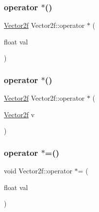 \mbox{\label{class_vector2f_aa294c4f2927395f299c8c2edcd20e9fa}} 
\subsubsection{\texorpdfstring{operator $\ast$()}{operator *()}\hspace{0.1cm}{\footnotesize\ttfamily [1/2]}}
{\footnotesize\ttfamily \mbox{\hyperlink{class_vector2f}{Vector2f}} Vector2f\+::operator $\ast$ (\begin{DoxyParamCaption}\item[{float}]{val }\end{DoxyParamCaption})}

\mbox{\label{class_vector2f_a9d3e3d9000757cb55b2c079a1051e4ec}} 
\subsubsection{\texorpdfstring{operator $\ast$()}{operator *()}\hspace{0.1cm}{\footnotesize\ttfamily [2/2]}}
{\footnotesize\ttfamily \mbox{\hyperlink{class_vector2f}{Vector2f}} Vector2f\+::operator $\ast$ (\begin{DoxyParamCaption}\item[{\mbox{\hyperlink{class_vector2f}{Vector2f}}}]{v }\end{DoxyParamCaption})}

\mbox{\label{class_vector2f_a236a3df8c7038735777a6bb82d72d3e0}} 
\subsubsection{\texorpdfstring{operator $\ast$=()}{operator *=()}}
{\footnotesize\ttfamily void Vector2f\+::operator $\ast$= (\begin{DoxyParamCaption}\item[{float}]{val }\end{DoxyParamCaption})}

\mbox{\label{class_vector2f_abd8a71379a15bee64aee32cf3824a5e6}} 
